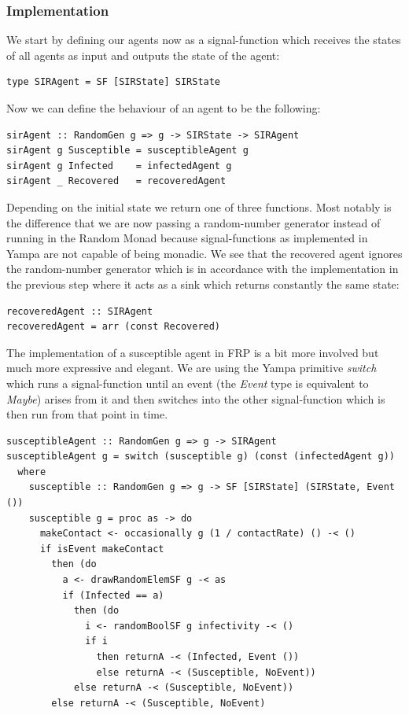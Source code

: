 \subsubsection{Implementation}
We start by defining our agents now as a signal-function which receives the states of all agents as input and outputs the state of the agent:

\begin{verbatim}
type SIRAgent = SF [SIRState] SIRState 
\end{verbatim}

Now we can define the behaviour of an agent to be the following:

\begin{verbatim}
sirAgent :: RandomGen g => g -> SIRState -> SIRAgent
sirAgent g Susceptible = susceptibleAgent g
sirAgent g Infected    = infectedAgent g
sirAgent _ Recovered   = recoveredAgent
\end{verbatim}

Depending on the initial state we return one of three functions. Most notably is the difference that we are now passing a random-number generator instead of running in the Random Monad because signal-functions as implemented in Yampa are not capable of being monadic. We see that the recovered agent ignores the random-number generator which is in accordance with the implementation in the previous step where it acts as a sink which returns constantly the same state:

\begin{verbatim}
recoveredAgent :: SIRAgent
recoveredAgent = arr (const Recovered)
\end{verbatim}

The implementation of a susceptible agent in FRP is a bit more involved but much more expressive and elegant. We are using the Yampa primitive \textit{switch} which runs a signal-function until an event (the \textit{Event} type is equivalent to \textit{Maybe}) arises from it and then switches into the other signal-function which is then run from that point in time.

\begin{verbatim}
susceptibleAgent :: RandomGen g => g -> SIRAgent
susceptibleAgent g = switch (susceptible g) (const (infectedAgent g))
  where
    susceptible :: RandomGen g => g -> SF [SIRState] (SIRState, Event ())
    susceptible g = proc as -> do
      makeContact <- occasionally g (1 / contactRate) () -< ()
      if isEvent makeContact
        then (do
          a <- drawRandomElemSF g -< as
          if (Infected == a)
            then (do
              i <- randomBoolSF g infectivity -< ()
              if i
                then returnA -< (Infected, Event ())
                else returnA -< (Susceptible, NoEvent))
            else returnA -< (Susceptible, NoEvent))
        else returnA -< (Susceptible, NoEvent)
\end{verbatim}

